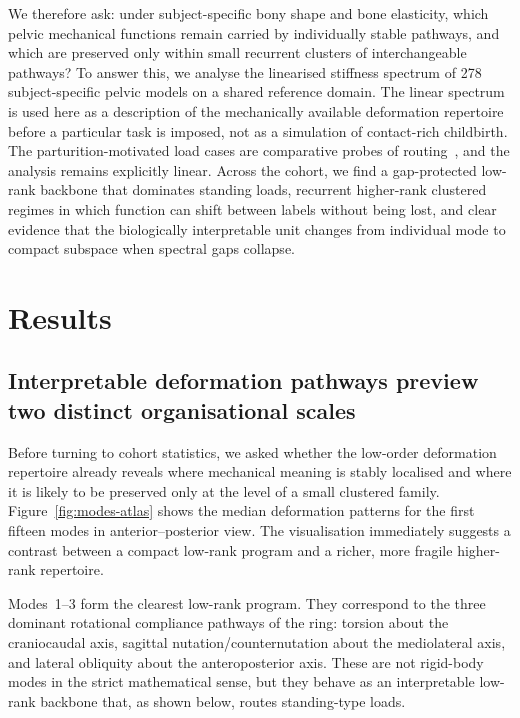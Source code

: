 \documentclass[11pt]{article}
\begin{document}
We therefore ask: under subject-specific bony shape and bone elasticity, which pelvic mechanical functions remain carried by individually stable pathways, and which are preserved only within small recurrent clusters of interchangeable pathways?
To answer this, we analyse the linearised stiffness spectrum of 278 subject-specific pelvic models on a shared reference domain.
The linear spectrum is used here as a description of the mechanically available deformation repertoire before a particular task is imposed, not as a simulation of contact-rich childbirth.
The parturition-motivated load cases are comparative probes of routing~\citep{ChenGrimm2021,Almeida2024Uterus}, and the analysis remains explicitly linear.
Across the cohort, we find a gap-protected low-rank backbone that dominates standing loads, recurrent higher-rank clustered regimes in which function can shift between labels without being lost, and clear evidence that the biologically interpretable unit changes from individual mode to compact subspace when spectral gaps collapse.

\section{Results}
\label{sec:results}

\subsection{Interpretable deformation pathways preview two distinct organisational scales}
\label{sec:atlas-results}

Before turning to cohort statistics, we asked whether the low-order deformation repertoire already reveals where mechanical meaning is stably localised and where it is likely to be preserved only at the level of a small clustered family.
Figure~\ref{fig:modes-atlas} shows the median deformation patterns for the first fifteen modes in anterior--posterior view.
The visualisation immediately suggests a contrast between a compact low-rank program and a richer, more fragile higher-rank repertoire.

Modes~1--3 form the clearest low-rank program.
They correspond to the three dominant rotational compliance pathways of the ring: torsion about the craniocaudal axis, sagittal nutation/counternutation about the mediolateral axis, and lateral obliquity about the anteroposterior axis.
These are not rigid-body modes in the strict mathematical sense, but they behave as an interpretable low-rank backbone that, as shown below, routes standing-type loads.
\end{document}
